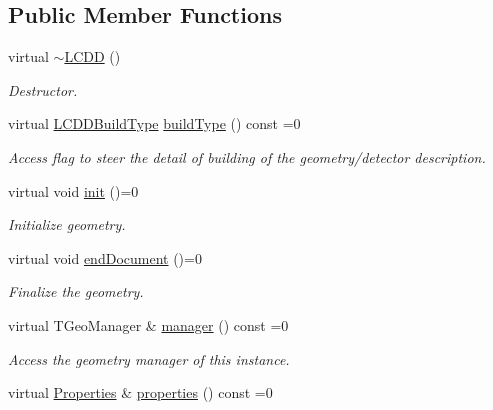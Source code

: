 \subsection*{Public Member Functions}
\begin{DoxyCompactItemize}
\item 
virtual \hyperlink{class_d_d4hep_1_1_geometry_1_1_l_c_d_d_a420f99b6dbdcde67557bafb49a8c18c1}{$\sim$LCDD} ()
\begin{DoxyCompactList}\small\item\em Destructor. \item\end{DoxyCompactList}\item 
virtual \hyperlink{namespace_d_d4hep_acafe43ba4537ab6e999e808142965fab}{LCDDBuildType} \hyperlink{class_d_d4hep_1_1_geometry_1_1_l_c_d_d_a73400f14f6384e1c84470595fc3667fd}{buildType} () const =0
\begin{DoxyCompactList}\small\item\em Access flag to steer the detail of building of the geometry/detector description. \item\end{DoxyCompactList}\item 
virtual void \hyperlink{class_d_d4hep_1_1_geometry_1_1_l_c_d_d_a9a4f55004e7375b2b20fb64e1a7ee8de}{init} ()=0
\begin{DoxyCompactList}\small\item\em Initialize geometry. \item\end{DoxyCompactList}\item 
virtual void \hyperlink{class_d_d4hep_1_1_geometry_1_1_l_c_d_d_abe2147b8363040ce95bb40f810d95b36}{endDocument} ()=0
\begin{DoxyCompactList}\small\item\em Finalize the geometry. \item\end{DoxyCompactList}\item 
virtual TGeoManager \& \hyperlink{class_d_d4hep_1_1_geometry_1_1_l_c_d_d_af209f1ecaad7336e14ffee002215aa93}{manager} () const =0
\begin{DoxyCompactList}\small\item\em Access the geometry manager of this instance. \item\end{DoxyCompactList}\item 
virtual \hyperlink{class_d_d4hep_1_1_geometry_1_1_l_c_d_d_a89096744868821bf5dcb0c0560b348c9}{Properties} \& \hyperlink{class_d_d4hep_1_1_geometry_1_1_l_c_d_d_a15fac6166c5a16968cf9f60b515f4125}{properties} () const =0

\end{DoxyCompactItemize}
